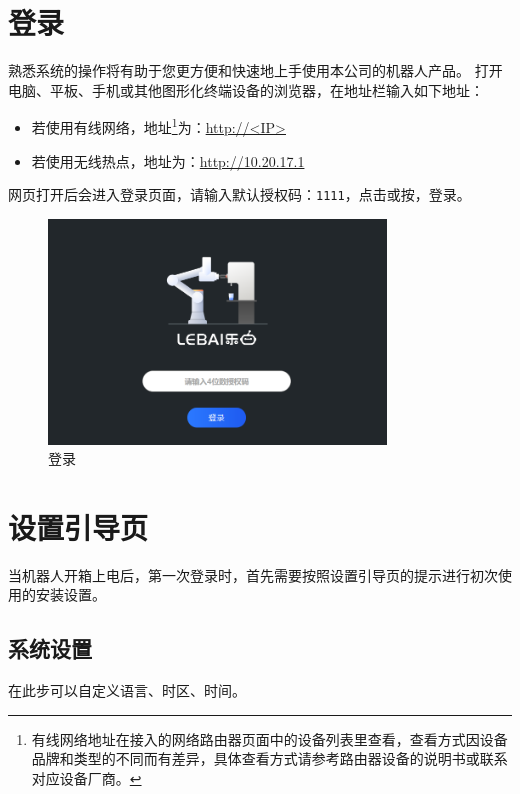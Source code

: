 \section{登录\LM}
熟悉\LM 系统的操作将有助于您更方便和快速地上手使用本公司的机器人产品。
打开电脑、平板、手机或其他图形化终端设备的浏览器，在地址栏输入如下地址：
\begin{itemize}
	\item 若使用有线网络，地址\footnote{有线网络地址在接入的网络路由器页面中的设备列表里查看，查看方式因设备品牌和类型的不同而有差异，具体查看方式请参考路由器设备的说明书或联系对应设备厂商。}为：\url{http://<IP>}
	\item 若使用无线热点，地址为：\url{http://10.20.17.1}
\end{itemize}

网页打开后会进入登录页面，请输入默认授权码：\verb|1111|，点击或按，登录\LM。

\begin{figure}[ht]
    \centering
    \includegraphics[width=0.8\textwidth]{screen/2-4.png}
    \caption{登录\LM}
    \label{fig:登录LM}
\end{figure}

\clearpage

\section{设置引导页}

当机器人开箱上电后，第一次登录\LM 时，首先需要按照设置引导页的提示进行初次使用的安装设置。
\subsection{系统设置}
在此步可以自定义语言、时区、时间。

